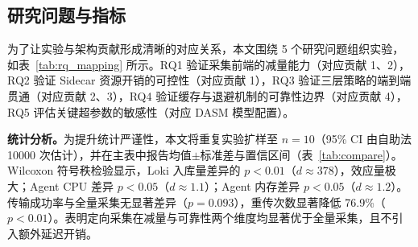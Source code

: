 \subsection{研究问题与指标}
为了让实验与架构贡献形成清晰的对应关系，本文围绕 5 个研究问题组织实验，如表~\ref{tab:rq_mapping} 所示。RQ1 验证采集前端的减量能力（对应贡献 1、2），RQ2 验证 Sidecar 资源开销的可控性（对应贡献 1），RQ3 验证三层策略的端到端贯通（对应贡献 2、3），RQ4 验证缓存与退避机制的可靠性边界（对应贡献 4），RQ5 评估关键超参数的敏感性（对应 DASM 模型配置）。
\begin{table}[H]
  \centering
  \small
  \caption{研究问题、指标与证据映射}\label{tab:rq_mapping}
\end{table}
\textbf{统计分析。}为提升统计严谨性，本文将重复实验扩样至 $n{=}10$（95\% CI 由自助法 10000 次估计），并在主表中报告均值$\pm$标准差与置信区间（表~\ref{tab:compare}）。Wilcoxon 符号秩检验显示，Loki 入库量差异的 $p<0.01$（$d{\approx}378$），效应量极大；Agent CPU 差异 $p<0.05$（$d{\approx}1.1$）；Agent 内存差异 $p<0.05$（$d{\approx}1.2$）。传输成功率与全量采集无显著差异（$p=0.093$），重传次数显著降低 76.9\%（$p<0.01$）。表明定向采集在减量与可靠性两个维度均显著优于全量采集，且不引入额外延迟开销。
